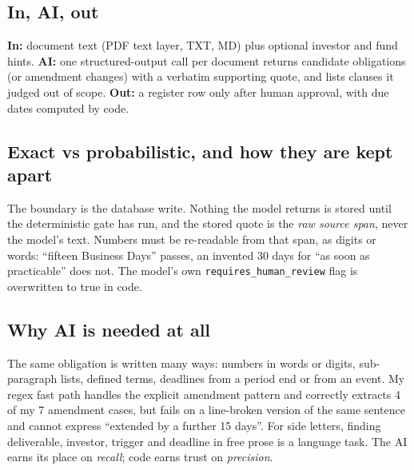 \documentclass[10pt,a4paper]{article}
\newcommand{\code}[1]{\texttt{\small #1}}
\begin{document}
\vspace{-1ex}
\begin{minipage}[t]{0.485\linewidth}
\subsection{In, AI, out}
\textbf{In:} document text (PDF text layer, TXT, MD) plus optional investor and fund hints. \textbf{AI:} one structured-output call per document returns candidate obligations (or amendment changes) with a verbatim supporting quote, and lists clauses it judged out of scope. \textbf{Out:} a register row only after human approval, with due dates computed by code.

\subsection{Exact vs probabilistic, and how they are kept apart}
The boundary is the database write. Nothing the model returns is stored until the deterministic gate has run, and the stored quote is the \emph{raw source span}, never the model's text. Numbers must be re-readable from that span, as digits or words: ``fifteen Business Days'' passes, an invented 30 days for ``as soon as practicable'' does not. The model's own \code{requires\_human\_review} flag is overwritten to true in code.

\subsection{Why AI is needed at all}
The same obligation is written many ways: numbers in words or digits, sub-paragraph lists, defined terms, deadlines from a period end or from an event. My regex fast path handles the explicit amendment pattern and correctly extracts 4 of my 7 amendment cases, but fails on a line-broken version of the same sentence and cannot express ``extended by a further 15 days''. For side letters, finding deliverable, investor, trigger and deadline in free prose is a language task. The AI earns its place on \emph{recall}; code earns trust on \emph{precision}.
\end{minipage}\hfill
\end{document}
